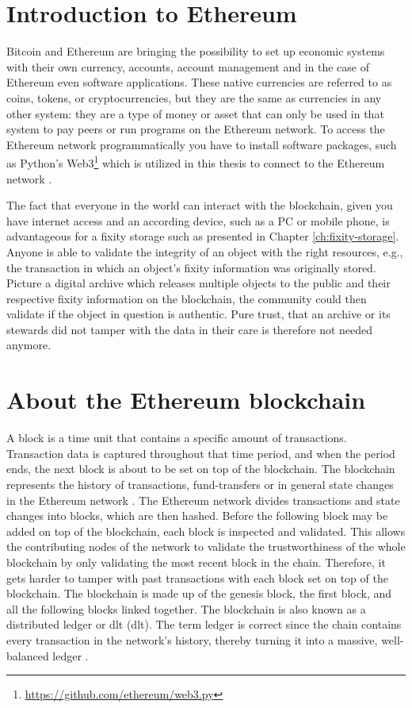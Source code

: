 \section{Introduction to Ethereum}
\label{sec:eth-blockchain}
Bitcoin and Ethereum are bringing the possibility to set up economic systems with their own currency, accounts, account management and in the case of Ethereum even software applications. These native currencies are referred to as coins, tokens, or cryptocurrencies, but they are the same as currencies in any other system: they are a type of money or asset that can only be used in that system to pay peers or run programs on the Ethereum network. To access the Ethereum network programmatically you have to install software packages, such as Python's Web3\footnote{\url{https://github.com/ethereum/web3.py}} which is utilized in this thesis to connect to the Ethereum network \cite[2]{dannen2017introducing}.

The fact that everyone in the world can interact with the blockchain, given you have internet access and an according device, such as a PC or mobile phone, is advantageous for a fixity storage such as presented in Chapter \ref{ch:fixity-storage}. Anyone is able to validate the integrity of an object with the right resources, e.g., the transaction in which an object's fixity information was originally stored. Picture a digital archive which releases multiple objects to the public and their respective fixity information on the blockchain, the community could then validate if the object in question is authentic. Pure trust, that an archive or its stewards did not tamper with the data in their care is therefore not needed anymore.
\section{About the Ethereum blockchain}
A block is a time unit that contains a specific amount of transactions. Transaction data is captured throughout that time period, and when the period ends, the next block is about to be set on top of the blockchain. The blockchain represents the history of transactions, fund-transfers or in general state changes in the Ethereum network \cite[43]{dannen2017introducing}.
The Ethereum network divides transactions and state changes into blocks, which are then hashed. Before the following block may be added on top of the blockchain, each block is inspected and validated. This allows the contributing nodes of the network to validate the trustworthiness of the whole blockchain by only validating the most recent block in the chain. Therefore, it gets harder to tamper with past transactions with each block set on top of the blockchain. The blockchain is made up of the genesis block, the first block, and all the following blocks linked together. The blockchain is also known as a distributed ledger or \acrlong{dlt} (\acrshort{dlt}). The term ledger is correct since the chain contains every transaction in the network's history, thereby turning it into a massive, well-balanced ledger \cite[55]{dannen2017introducing}. 
